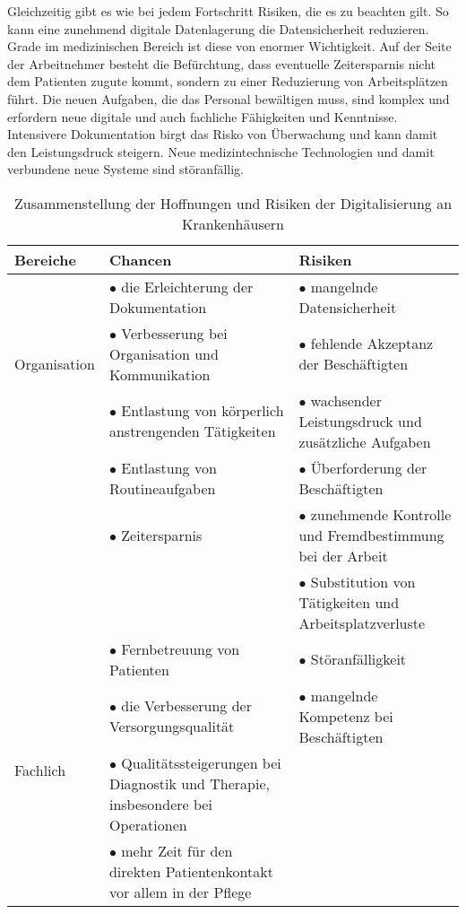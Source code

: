 Gleichzeitig gibt es wie bei jedem Fortschritt Risiken, die es zu beachten gilt. So kann eine zunehmend digitale Datenlagerung die Datensicherheit reduzieren. Grade im medizinischen Bereich ist diese von enormer Wichtigkeit. Auf der Seite der Arbeitnehmer besteht die Befürchtung, dass eventuelle Zeitersparnis nicht dem Patienten zugute kommt, sondern zu einer Reduzierung von Arbeitsplätzen führt. Die neuen Aufgaben, die das Personal bewältigen muss, sind komplex und erfordern neue digitale und auch fachliche Fähigkeiten und Kenntnisse. Intensivere Dokumentation birgt das Risko von Überwachung und kann damit den Leistungsdruck steigern. Neue medizintechnische Technologien und damit verbundene neue Systeme sind störanfällig. \parencite{braeutigam2017}
\begin{table}[h]
	\begin{tabular}{l|p{}|p{}}
	\textbf{Bereiche}&\textbf{Chancen}&\textbf{Risiken}\\
	\hline
	\multirow{3}{*}{Organisation}
		&$\bullet$ die Erleichterung der Dokumentation &$\bullet$ mangelnde Datensicherheit\\
		&$\bullet$ Verbesserung bei Organisation und Kommunikation &$\bullet$ fehlende Akzeptanz der Beschäftigten\\
	\hline
	\multirow{7}{*}{Personal}
		&$\bullet$ Entlastung von körperlich anstrengenden Tätigkeiten &$\bullet$ wachsender Leistungsdruck und zusätzliche Aufgaben\\
		&$\bullet$ Entlastung von Routineaufgaben &$\bullet$ Überforderung der Beschäftigten\\
		&$\bullet$ Zeitersparnis&$\bullet$ zunehmende Kontrolle und Fremdbestimmung bei der Arbeit\\
		&&$\bullet$ Substitution von Tätigkeiten und Arbeitsplatzverluste\\
	\hline
	\multirow{6}{*}{Fachlich}
		&$\bullet$ Fernbetreuung von Patienten&$\bullet$ Störanfälligkeit\\
		&$\bullet$ die Verbesserung der Versorgungsqualität &$\bullet$ mangelnde Kompetenz bei Beschäftigten\\
		&$\bullet$ Qualitätssteigerungen bei Diagnostik und Therapie, insbesondere bei Operationen&\\
		&$\bullet$ mehr Zeit für den direkten Patientenkontakt vor allem in der Pflege&\\
	\end{tabular}
	\caption{Zusammenstellung der Hoffnungen und Risiken der Digitalisierung an Krankenhäusern \parencite{braeutigam2017}}
	\label{tab:hoffnung_risiken}
\end{table}\\
